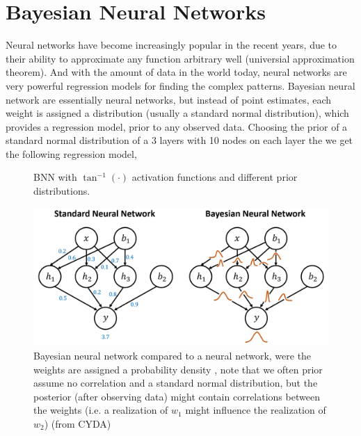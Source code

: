 \section{Bayesian Neural Networks}\label{BNN}
Neural networks have become increasingly popular in the recent years, due to their ability to
approximate any function arbitrary well (universial approximation theorem). And with the amount of
data in the world today, neural
networks are very powerful regression models for finding the complex patterns. Bayesian neural
network are essentially neural networks, but instead of point estimates, each weight is assigned a
distribution (usually a standard normal distribution), which provides a regression model, 
prior to any observed data. Choosing the prior of a standard normal distribution of a 
3 layers with 10 nodes on each layer the we get the following regression model, 
\begin{figure}
    \caption{BNN with $\tan^{-1}(\cdot)$ activation functions and different prior distributions. }%
    \label{fig:example2}%
\end{figure}

\begin{figure}
    \centering
    \includegraphics[width=\textwidth]{Pictures/BNN_illustration.png}
    \caption*{Bayesian neural network compared to a neural network, were the weights are assigned a
    probability density , note that we often prior assume no correlation and a standard normal
    distribution, but the posterior (after observing data) might contain correlations between the
    weights (i.e. a realization of $w_1$ might influence the realization of $w_2$) (from CYDA)}
\end{figure}

